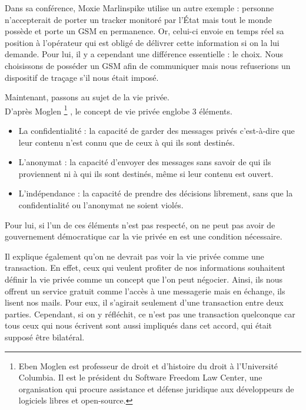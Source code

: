Dans sa conférence, Moxie Marlinspike utilise un autre exemple : personne n'accepterait de porter un tracker monitoré par l'État mais tout le monde possède et porte un GSM en permanence. Or, celui-ci envoie en temps réel sa position à l'opérateur qui est obligé de délivrer cette information si on la lui demande. Pour lui, il y a cependant une différence essentielle : le choix. Nous choisissons de posséder un GSM afin de communiquer mais nous refuserions un dispositif de traçage s'il nous était imposé.
\newline

\newpage
Maintenant, passons au sujet de la vie privée.\\
D'après Moglen \footnote{Eben Moglen est professeur de droit et d'histoire du droit à l'Université Columbia. Il est le président du Software Freedom Law Center, une organisation qui procure assistance et défense juridique aux développeurs de logiciels libres et open-source.} \cite{Moglen_part2}, le concept de vie privée englobe 3 éléments.
\begin{itemize}
  \item La confidentialité : la capacité de garder des messages privés c'est-à-dire que leur contenu n'est connu que de ceux à qui ils sont destinés.
  \item L'anonymat : la capacité d'envoyer des messages sans savoir de qui ils proviennent ni à qui ils sont destinés, même si leur contenu est ouvert.
  \item L'indépendance : la capacité de prendre des décisions librement, sans que la confidentialité ou l'anonymat ne soient violés.
\end{itemize}

Pour lui, si l'un de ces éléments n'est pas respecté, on ne peut pas avoir de gouvernement démocratique car la vie privée en est une condition nécessaire.
\newline

Il explique également qu'on ne devrait pas voir la vie privée comme une transaction. En effet, ceux qui veulent profiter de nos informations souhaitent définir la vie privée comme un concept que l'on peut négocier. Ainsi, ils nous offrent un service gratuit comme l'accès à une messagerie mais en échange, ils lisent nos mails. Pour eux, il s'agirait seulement d'une transaction entre deux parties. Cependant, si on y réfléchit, ce n'est pas une transaction quelconque car tous ceux qui nous écrivent sont aussi impliqués dans cet accord, qui était supposé être bilatéral.

